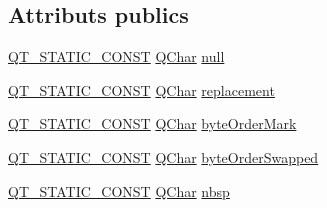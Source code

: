 \subsection*{Attributs publics}
\begin{DoxyCompactItemize}
\item 
\hyperlink{qglobal_8h_a2135277daaba0e4cbe16fc9d1ebd21a4}{Q\+T\+\_\+\+S\+T\+A\+T\+I\+C\+\_\+\+C\+O\+N\+S\+T} \hyperlink{class_q_char}{Q\+Char} \hyperlink{class_q_char_afdc80b6130ca162603a5bc20ca74942b}{null}
\item 
\hyperlink{qglobal_8h_a2135277daaba0e4cbe16fc9d1ebd21a4}{Q\+T\+\_\+\+S\+T\+A\+T\+I\+C\+\_\+\+C\+O\+N\+S\+T} \hyperlink{class_q_char}{Q\+Char} \hyperlink{class_q_char_abdeb014a60f5abbaa2c136f9d746e3a2}{replacement}
\item 
\hyperlink{qglobal_8h_a2135277daaba0e4cbe16fc9d1ebd21a4}{Q\+T\+\_\+\+S\+T\+A\+T\+I\+C\+\_\+\+C\+O\+N\+S\+T} \hyperlink{class_q_char}{Q\+Char} \hyperlink{class_q_char_a830ccc008bee0a07b0eb57232d347d08}{byte\+Order\+Mark}
\item 
\hyperlink{qglobal_8h_a2135277daaba0e4cbe16fc9d1ebd21a4}{Q\+T\+\_\+\+S\+T\+A\+T\+I\+C\+\_\+\+C\+O\+N\+S\+T} \hyperlink{class_q_char}{Q\+Char} \hyperlink{class_q_char_ada7e951f45ce64ab6a51b9995d82aaf8}{byte\+Order\+Swapped}
\item 
\hyperlink{qglobal_8h_a2135277daaba0e4cbe16fc9d1ebd21a4}{Q\+T\+\_\+\+S\+T\+A\+T\+I\+C\+\_\+\+C\+O\+N\+S\+T} \hyperlink{class_q_char}{Q\+Char} \hyperlink{class_q_char_af63d0090d00cf90fe934fb2554a595cb}{nbsp}
\end{DoxyCompactItemize}
